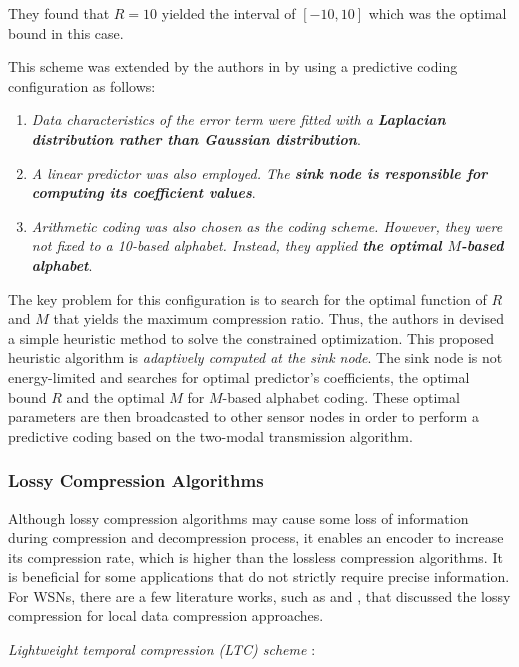 \begin{enumerate}
        They found that $R=10$ yielded the interval of $\left[ -10,10 \right]$ which was the optimal bound in this case. 

        This scheme was extended by the authors in \cite{Liang2010} by using a predictive coding configuration as follows: 
        \begin{enumerate}
            \item \emph{\textcolor[rgb]{1,0,0}{Data characteristics of the error term were fitted with a \textbf{Laplacian distribution rather than Gaussian distribution}}}.
            \item \emph{\textcolor[rgb]{1,0,0}{A linear predictor was also employed. The \textbf{sink node is responsible for computing its coefficient values}}}.
            \item \emph{\textcolor[rgb]{1,0,0}{Arithmetic coding was also chosen as the coding scheme. However, they were not fixed to a 10-based alphabet. Instead, they applied \textbf{the optimal $M$-based alphabet}}}.
        \end{enumerate}
        The key problem for this configuration is to \textcolor[rgb]{1,0,0}{search for the optimal function of $R$ and $M$ that yields the maximum compression ratio}. Thus, the authors in \cite{Liang2010} devised a simple heuristic method to solve the constrained optimization. This proposed heuristic algorithm is \emph{\textcolor[rgb]{1,0,0}{adaptively computed at the sink node}}. The sink node is not energy-limited and searches for optimal predictor's coefficients, the optimal bound $R$ and the optimal $M$ for $M$-based alphabet coding. These optimal parameters are then broadcasted to other sensor nodes in order to perform a predictive coding based on the two-modal transmission algorithm.
\end{enumerate}


\subsubsection{Lossy Compression Algorithms}

Although lossy compression algorithms may cause some loss of information during compression and decompression process, it enables an encoder to increase its compression rate, which is higher than the lossless compression algorithms. It is beneficial for some applications that do not strictly require precise information. For WSNs, there are a few literature works, such as \cite{Schoellhammer2004} and \cite{Marcelloni:2010aa}, that discussed the lossy compression for \textcolor[rgb]{1,0,0}{local data compression approaches}.

\emph{\textcolor[rgb]{1,0,0}{Lightweight temporal compression (LTC) scheme}} \cite{Schoellhammer2004}: 




